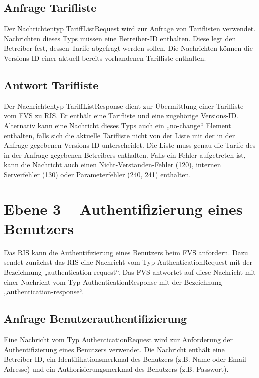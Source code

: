 

\subsection{Anfrage Tarifliste}
Der Nachrichtentyp TariffListRequest wird zur Anfrage von Tariflisten verwendet. Nachrichten dieses Typs müssen eine Betreiber-ID enthalten. Diese legt den Betreiber fest, dessen Tarife abgefragt werden sollen. Die Nachrichten können die Versions-ID einer aktuell bereits vorhandenen Tarifliste enthalten.



\subsection{Antwort Tarifliste}
Der Nachrichtentyp TariffListResponse dient zur Übermittlung einer Tarifliste vom FVS zu RIS. Er enthält eine Tarifliste und eine zugehörige Versions-ID. Alternativ kann eine Nachricht dieses Typs auch ein „no-change“ Element enthalten, falls sich die aktuelle Tarifliste nicht von der Liste mit der in der Anfrage gegebenen Versions-ID  unterscheidet. Die Liste muss genau die Tarife des in der Anfrage gegebenen Betreibers enthalten. Falls ein Fehler aufgetreten ist, kann die Nachricht auch einen Nicht-Verstanden-Fehler (120), internen Serverfehler (130) oder Parameterfehler (240, 241) enthalten.




\section{Ebene 3 -- Authentifizierung eines Benutzers}
Das RIS kann die Authentifizierung eines Benutzers beim FVS anfordern. Dazu sendet zunächst das RIS eine Nachricht vom Typ AuthenticationRequest mit der Bezeichnung „authentication-request“. Das FVS antwortet auf diese Nachricht mit einer Nachricht vom Typ AuthenticationResponse mit der Bezeichnung „authentication-response“.



\subsection{Anfrage Benutzerauthentifizierung}
Eine Nachricht vom Typ AuthenticationRequest wird zur Anforderung der Authentifizierung eines Benutzers verwendet. Die Nachricht enthält eine Betreiber-ID, ein Identifikationsmerkmal des Benutzers (z.B. Name oder Email-Adresse) und ein Authorisierungsmerkmal des Benutzers (z.B. Passwort).

